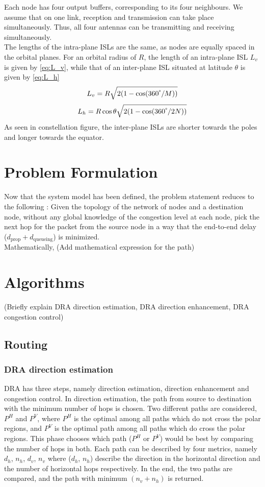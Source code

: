 \documentclass[10pt,conference, draftcls, letterpaper]{IEEEtran}
\newcommand{\rough}[1]{{\color{red} #1}}
\begin{document}
Each node has four output buffers, corresponding to its four neighbours. We assume that on one link, reception and transmission can take place simultaneously. Thus, all four antennas can be transmitting and receiving simultaneously.\\
The lengths of the intra-plane ISLs are the same, as nodes are equally spaced in the orbital planes. For an orbital radius of $R$, the length of an intra-plane ISL $L_v$ is given by \eqref{eq:L_v}, while that of an inter-plane ISL situated at latitude $\theta$ is given by \eqref{eq:L_h}
\begin{equation}
\label{eq:L_v}
	L_v = R\sqrt{2(1-\cos(360^\degree/M))}
\end{equation}
\begin{equation}
	\label{eq:L_h}
	L_h = R\cos{\theta}\sqrt{2(1-\cos(360^\degree/2N))}
\end{equation}
As seen in \rough{constellation figure}, the inter-plane ISLs are shorter towards the poles and longer towards the equator.
\section{Problem Formulation}
Now that the system model has been defined, the problem statement reduces to the following : Given the topology of the network of nodes and a destination node, without any global knowledge of the congestion level at each node, pick the next hop for the packet from the source node in a way that the end-to-end delay ($d_{\text{prop}}+d_{\text{queueing}}$) is minimized.\\
Mathematically, \rough{(Add mathematical expression for the path)}
\section{Algorithms}
\rough{(Briefly explain DRA direction estimation, DRA direction enhancement, DRA congestion control)}\\
\subsection{Routing}
\subsubsection{DRA direction estimation}
DRA has three steps, namely direction estimation, direction enhancement and congestion control. In direction estimation, the path from source to destination with the minimum number of hops is chosen. Two different paths are considered, $P^H$ and $P^V$, where $P^H$ is the optimal among all paths which do not cross the polar regions, and $P^V$ is the optimal path among all paths which do cross the polar regions. This phase chooses which path ($P^H$ or $P^V$) would be best by comparing the number of hops in both. Each path can be described by four metrics, namely $d_h$, $n_h$, $d_v$, $n_v$ where ($d_h$, $n_h$) describe the direction in the horizontal direction and the number of horizontal hops respectively. In the end, the two paths are compared, and the path with minimum $(n_v + n_h)$ is returned.\\
\end{document}
